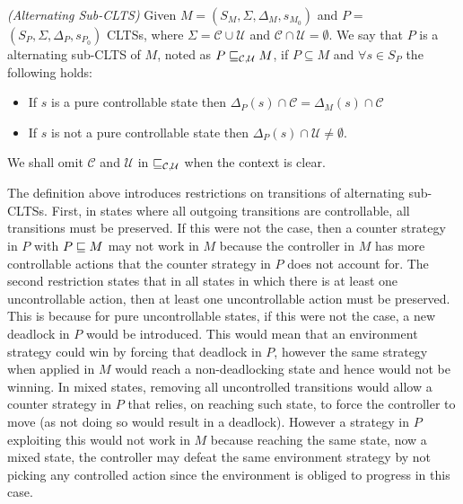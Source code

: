 \begin{definition}\label{def:nonreal-legalEnvironment}\emph{(Alternating Sub-CLTS)}
Given $M = (S_M, \Sigma, \Delta_M, s_{M_0})$ and
 $P =$ $(S_P,\Sigma,\Delta_P,s_{P_0})$ CLTSs, 
where $\Sigma =\mathcal{C}\cup \mathcal{U}$ and $\mathcal{C}\cap
\mathcal{U}=\emptyset$. We say that $P$ is a alternating
 sub-CLTS of $M$, noted as $P \sqsubseteq_{\mathcal{C},\mathcal{U}} M$, if  $P \subseteq M$  and $\forall s \in S_{P}$ the following holds:
 \begin{itemize}
\item If $s$ is a pure controllable state then $\Delta_{P}(s) \cap \mathcal{C} = \Delta_{M}(s) \cap \mathcal{C} $
\item If $s$ is not a pure controllable state then  
$\Delta_{P}(s) \cap \mathcal{U} \neq \emptyset$.
 \end{itemize}
 
We shall omit $\mathcal{C}$ and $\mathcal{U}$ in $\sqsubseteq_{\mathcal{C},\mathcal{U}}$ when the context is clear. 
 \end{definition}

The definition above introduces  restrictions on transitions of alternating sub-CLTSs. 
First, in states where all outgoing transitions are controllable, all transitions must be preserved. 
If this were not the case, then a counter strategy in $P$ with $P \sqsubseteq M$ may not work in $M$ because the controller in $M$ has more controllable actions that the counter strategy in $P$ does not account for. 
The second restriction states that in all states in which there is at least one uncontrollable action, then at least one uncontrollable action must be preserved. This is because for pure uncontrollable states, if this were not the case, a new deadlock in $P$ would be introduced. This would mean that an environment strategy could win by forcing that deadlock in $P$, however the same strategy when applied in $M$ would reach a non-deadlocking state and hence would not be winning. In mixed states, removing all uncontrolled transitions would allow a counter strategy in $P$ that relies, on reaching such state, to force the controller to move (as not doing so would result in a deadlock). However a strategy in $P$ exploiting this would not work in $M$ because reaching the same state, now a mixed state, the controller may defeat the same environment strategy by not picking any controlled action since the environment is obliged to progress in this case. 

